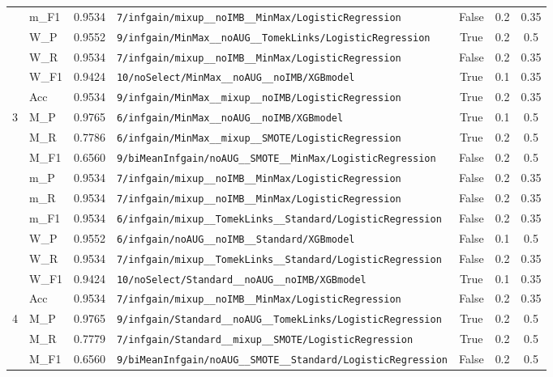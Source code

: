\begin{table}[htbp]
\begin{tabular}{|c|l|c|>{\ttfamily\footnotesize}p{7.2cm}|c|c|c|}
 & m\_F1 & 0.9534 & \texttt{7/infgain/mixup\_\_noIMB\_\_MinMax/LogisticRegression} & False & 0.2 & 0.35 \\
 & W\_P & 0.9552 & \texttt{9/infgain/MinMax\_\_noAUG\_\_TomekLinks/LogisticRegression} & True & 0.2 & 0.5 \\
 & W\_R & 0.9534 & \texttt{7/infgain/mixup\_\_noIMB\_\_MinMax/LogisticRegression} & False & 0.2 & 0.35 \\
 & W\_F1 & 0.9424 & \texttt{10/noSelect/MinMax\_\_noAUG\_\_noIMB/XGBmodel} & True & 0.1 & 0.35 \\
 & Acc & 0.9534 & \texttt{9/infgain/MinMax\_\_mixup\_\_noIMB/LogisticRegression} & True & 0.2 & 0.35 \\
\hline
\multirow{10}{*}{3} & M\_P & 0.9765 & \texttt{6/infgain/MinMax\_\_noAUG\_\_noIMB/XGBmodel} & True & 0.1 & 0.5 \\
 & M\_R & 0.7786 & \texttt{6/infgain/MinMax\_\_mixup\_\_SMOTE/LogisticRegression} & True & 0.2 & 0.5 \\
 & M\_F1 & 0.6560 & \texttt{9/biMeanInfgain/noAUG\_\_SMOTE\_\_MinMax/LogisticRegression} & False & 0.2 & 0.5 \\
 & m\_P & 0.9534 & \texttt{7/infgain/mixup\_\_noIMB\_\_MinMax/LogisticRegression} & False & 0.2 & 0.35 \\
 & m\_R & 0.9534 & \texttt{7/infgain/mixup\_\_noIMB\_\_MinMax/LogisticRegression} & False & 0.2 & 0.35 \\
 & m\_F1 & 0.9534 & \texttt{6/infgain/mixup\_\_TomekLinks\_\_Standard/LogisticRegression} & False & 0.2 & 0.35 \\
 & W\_P & 0.9552 & \texttt{6/infgain/noAUG\_\_noIMB\_\_Standard/XGBmodel} & False & 0.1 & 0.5 \\
 & W\_R & 0.9534 & \texttt{7/infgain/mixup\_\_TomekLinks\_\_Standard/LogisticRegression} & False & 0.2 & 0.35 \\
 & W\_F1 & 0.9424 & \texttt{10/noSelect/Standard\_\_noAUG\_\_noIMB/XGBmodel} & True & 0.1 & 0.35 \\
 & Acc & 0.9534 & \texttt{7/infgain/mixup\_\_noIMB\_\_MinMax/LogisticRegression} & False & 0.2 & 0.35 \\
\hline
\multirow{10}{*}{4} & M\_P & 0.9765 & \texttt{9/infgain/Standard\_\_noAUG\_\_TomekLinks/LogisticRegression} & True & 0.2 & 0.5 \\
 & M\_R & 0.7779 & \texttt{7/infgain/Standard\_\_mixup\_\_SMOTE/LogisticRegression} & True & 0.2 & 0.5 \\
 & M\_F1 & 0.6560 & \texttt{9/biMeanInfgain/noAUG\_\_SMOTE\_\_Standard/LogisticRegression} & False & 0.2 & 0.5 \\

\end{tabular}
\end{table}
